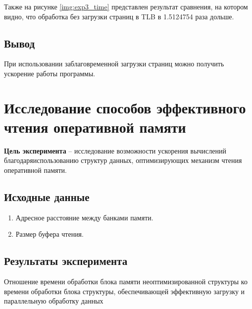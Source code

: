 %

\clearpage

Также на рисунке \ref{img:exp3_time} представлен результат сравнения, на котором видно, что обработка без загрузки страниц в TLB в 1.5124754 раза дольше.



\subsection{Вывод}

При использовании заблаговременной загрузки страниц можно получить ускорение работы программы.




\section{Исследование способов эффективного  чтения оперативной памяти}

\textbf{Цель эксперимента} -- исследование возможности ускорения вычислений благодаряиспользованию структур данных, оптимизирующих механизм чтения оперативной памяти.

\subsection{Исходные данные}
\begin{enumerate}
	\item Адресное расстояние между банками памяти.
	\item Размер буфера чтения.
\end{enumerate}

\subsection{Результаты эксперимента}
Отношение   времени   обработки   блока   памяти неоптимизированной структуры ко времени обработки блока структуры, обеспечивающей эффективную загрузку и параллельную обработку данных


